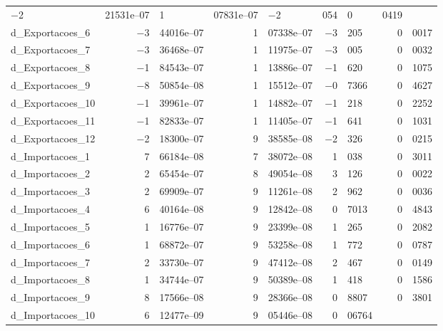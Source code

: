\documentclass[11pt]{article}
\begin{document}
\begin{center}
\begin{tabular}{lr@{,}lr@{,}lr@{,}lr@{,}l}
  $-$2&21531\textrm{e--07} &
    1&07831\textrm{e--07} &
      $-$2&054 &
        0&0419 \\
d\_Exportacoes\_6 &
  $-$3&44016\textrm{e--07} &
    1&07338\textrm{e--07} &
      $-$3&205 &
        0&0017 \\
d\_Exportacoes\_7 &
  $-$3&36468\textrm{e--07} &
    1&11975\textrm{e--07} &
      $-$3&005 &
        0&0032 \\
d\_Exportacoes\_8 &
  $-$1&84543\textrm{e--07} &
    1&13886\textrm{e--07} &
      $-$1&620 &
        0&1075 \\
d\_Exportacoes\_9 &
  $-$8&50854\textrm{e--08} &
    1&15512\textrm{e--07} &
      $-$0&7366 &
        0&4627 \\
d\_Exportacoes\_10 &
  $-$1&39961\textrm{e--07} &
    1&14882\textrm{e--07} &
      $-$1&218 &
        0&2252 \\
d\_Exportacoes\_11 &
  $-$1&82833\textrm{e--07} &
    1&11405\textrm{e--07} &
      $-$1&641 &
        0&1031 \\
d\_Exportacoes\_12 &
  $-$2&18300\textrm{e--07} &
    9&38585\textrm{e--08} &
      $-$2&326 &
        0&0215 \\
d\_Importacoes\_1 &
  7&66184\textrm{e--08} &
    7&38072\textrm{e--08} &
      1&038 &
        0&3011 \\
d\_Importacoes\_2 &
  2&65454\textrm{e--07} &
    8&49054\textrm{e--08} &
      3&126 &
        0&0022 \\
d\_Importacoes\_3 &
  2&69909\textrm{e--07} &
    9&11261\textrm{e--08} &
      2&962 &
        0&0036 \\
d\_Importacoes\_4 &
  6&40164\textrm{e--08} &
    9&12842\textrm{e--08} &
      0&7013 &
        0&4843 \\
d\_Importacoes\_5 &
  1&16776\textrm{e--07} &
    9&23399\textrm{e--08} &
      1&265 &
        0&2082 \\
d\_Importacoes\_6 &
  1&68872\textrm{e--07} &
    9&53258\textrm{e--08} &
      1&772 &
        0&0787 \\
d\_Importacoes\_7 &
  2&33730\textrm{e--07} &
    9&47412\textrm{e--08} &
      2&467 &
        0&0149 \\
d\_Importacoes\_8 &
  1&34744\textrm{e--07} &
    9&50389\textrm{e--08} &
      1&418 &
        0&1586 \\
d\_Importacoes\_9 &
  8&17566\textrm{e--08} &
    9&28366\textrm{e--08} &
      0&8807 &
        0&3801 \\
d\_Importacoes\_10 &
  6&12477\textrm{e--09} &
    9&05446\textrm{e--08} &
      0&06764 &

\end{tabular}
\end{center}
\end{document}
